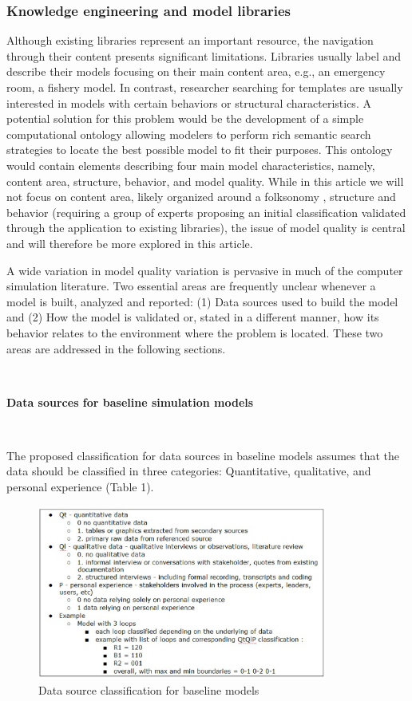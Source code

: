 \documentclass[11pt]{article}
\begin{document}
\subsubsection {Knowledge engineering and model libraries}
Although existing libraries represent an important resource, the navigation through their content presents significant limitations.  Libraries usually label and describe their models focusing on their main content area, e.g., an emergency room, a fishery model. In contrast, researcher searching for templates are usually interested in models with certain behaviors or structural characteristics.  A potential solution for this problem would be the development of a simple computational ontology \cite{ALLEMANGHENDLER2008}  allowing modelers to perform rich semantic search strategies to locate the best possible model to fit their purposes.  This ontology would contain elements describing four main model characteristics, namely, content area, structure, behavior, and model quality.  While in this article we will not focus on content area, likely organized around a folksonomy \cite{WAL2008}, structure and behavior (requiring a group of experts proposing an initial classification validated through the application to existing libraries), the issue of model quality is central and will therefore be more explored in this article.

A wide variation in model quality variation is pervasive in much of the computer simulation literature.  Two essential areas are frequently unclear whenever a model is built, analyzed and reported:  (1) Data sources used to build the model and (2) How the model is validated or, stated in a different manner, how its behavior relates to the environment where the problem is located.  These two areas are addressed in the following sections.

\

\noindent \textbf{Data sources for baseline simulation models}

\

The proposed classification for data sources in baseline models assumes that the data should be classified in three categories:  Quantitative, qualitative, and personal experience (Table 1). 

\begin{figure}[htbp]
	\centering
		\includegraphics[width=0.85\textwidth]{quadro1.ps}
	\caption{Data source classification for baseline models}
	\label{fig:quadro1}
\end{figure}
\end{document}

